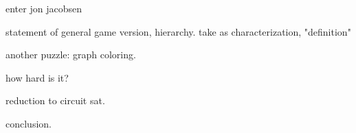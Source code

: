 \documentclass{presentation}
\begin{document}
\begin{frame}
  enter jon jacobsen
\end{frame}

\begin{frame}
  statement of general game version, hierarchy.  take as characterization,
  "definition"
\end{frame}

\begin{frame}
  another puzzle: graph coloring.

  how hard is it?
\end{frame}

\begin{frame}
  reduction to circuit sat.
\end{frame}

\begin{frame}
  conclusion.
\end{frame}
\end{document}

